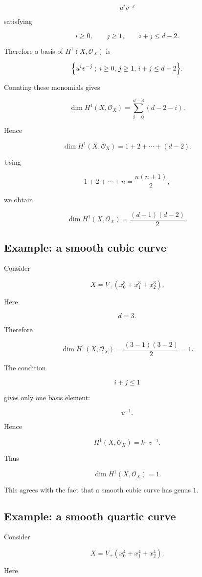 \documentclass[12pt,a4paper]{article}
\theoremstyle{notespace}
\begin{document}
\[
u^i v^{-j}
\]

satisfying

\[
i\ge 0,
\qquad
j\ge 1,
\qquad
i+j\le d-2.
\]

Therefore a basis of \(H^1(X,\mathcal O_X)\) is

\[
\Bigl\{
u^i v^{-j}
\; ; \;
i\ge0,\,
j\ge1,\,
i+j\le d-2
\Bigr\}.
\]

Counting these monomials gives

\[
\dim H^1(X,\mathcal O_X)
=
\sum_{i=0}^{d-3}
(d-2-i).
\]

Hence

\[
\dim H^1(X,\mathcal O_X)
=
1+2+\cdots +(d-2).
\]

Using

\[
1+2+\cdots+n=\frac{n(n+1)}2,
\]

we obtain

\[
\boxed{
	\dim H^1(X,\mathcal O_X)
	=
	\frac{(d-1)(d-2)}2.
}
\]

\subsection{Example: a smooth cubic curve}

Consider

\[
X=
V_+(x_0^3+x_1^3+x_2^3).
\]

Here

\[
d=3.
\]

Therefore

\[
\dim H^1(X,\mathcal O_X)
=
\frac{(3-1)(3-2)}2
=
1.
\]

The condition

\[
i+j\le 1
\]

gives only one basis element:

\[
v^{-1}.
\]

Hence

\[
H^1(X,\mathcal O_X)
=
k\cdot v^{-1}.
\]

Thus

\[
\boxed{
	\dim H^1(X,\mathcal O_X)=1.
}
\]

This agrees with the fact that a smooth cubic curve has genus \(1\).

\subsection{Example: a smooth quartic curve}

Consider

\[
X=
V_+(x_0^4+x_1^4+x_2^4).
\]

Here
\end{document}
